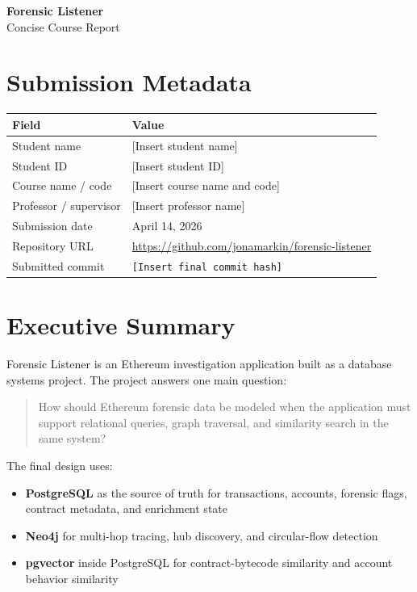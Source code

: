 \documentclass[11pt,a4paper]{article}
\begin{document}
\begin{center}
{\LARGE \textbf{Forensic Listener}}\\[0.35em]
{\large Concise Course Report}
\end{center}

\section*{Submission Metadata}

\begin{tabularx}{\textwidth}{@{}p{}Y@{}}
\toprule
\textbf{Field} & \textbf{Value} \\
\midrule
Student name & [Insert student name] \\
Student ID & [Insert student ID] \\
Course name / code & [Insert course name and code] \\
Professor / supervisor & [Insert professor name] \\
Submission date & April 14, 2026 \\
Repository URL & \url{https://github.com/jonamarkin/forensic-listener} \\
Submitted commit & \texttt{[Insert final commit hash]} \\
\bottomrule
\end{tabularx}

\section{Executive Summary}

Forensic Listener is an Ethereum investigation application built as a database
systems project. The project answers one main question:

\begin{quote}
How should Ethereum forensic data be modeled when the application must support
relational queries, graph traversal, and similarity search in the same system?
\end{quote}

The final design uses:

\begin{itemize}
\item \textbf{PostgreSQL} as the source of truth for transactions, accounts,
forensic flags, contract metadata, and enrichment state
\item \textbf{Neo4j} for multi-hop tracing, hub discovery, and circular-flow
detection
\item \textbf{pgvector} inside PostgreSQL for contract-bytecode similarity and
account behavior similarity
\end{itemize}
\end{document}
